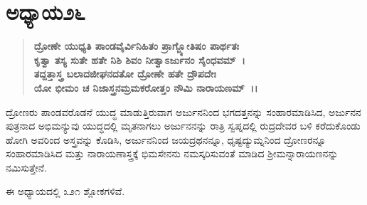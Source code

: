 \vspace{-.2cm}

\section*{ಅಧ್ಯಾಯ\enginline{-}೨೬}

\begin{verse}
\textbf{ದ್ರೋಣೇ ಯುಧ್ಯತಿ ಪಾಂಡವೈರ್ವಿನಿಹಿತಂ ಪ್ರಾಗ್ಜ್ಯೋತಿಷಂ ಪಾರ್ಥತಃ}\\\textbf{ಕೃತ್ವಾ ತಸ್ಯ ಸುತೇ ಹತೇ ನಿಶಿ ಶಿವಂ ನೀತ್ವಾಽರ್ಜುನಂ ಸೈಂಧವಮ್~।}\\\textbf{ತದ್ದತ್ತಾಸ್ತ್ರ ಬಲಾದಜೀಘನದತೋ ದ್ರೋಣೇ ಹತೇ ದ್ರೌಪದೇಃ}\\\textbf{ಯೋ ಭೀಮಂ ಚ ನಿಜಾಸ್ತ್ರನಮ್ರಮಕರೋತ್ತಂ ನೌಮಿ ನಾರಾಯಣಮ್~।।}
\end{verse}

ದ್ರೋಣರು ಪಾಂಡವರೊಡನೆ ಯುದ್ಧ ಮಾಡುತ್ತಿರುವಾಗ ಅರ್ಜುನನಿಂದ ಭಗದತ್ತನನ್ನು ಸಂಹಾರಮಾಡಿಸಿದ, ಅರ್ಜುನನ ಪುತ್ರನಾದ ಅಭಿಮನ್ಯುವು ಯುದ್ಧದಲ್ಲಿ ಮೃತನಾಗಲು ಅರ್ಜುನನನ್ನು ರಾತ್ರಿ ಸ್ವಪ್ನದಲ್ಲಿ ರುದ್ರದೇವರ ಬಳಿ ಕರೆದುಕೊಂಡು ಹೋಗಿ ಅವರಿಂದ ಅಸ್ತ್ರವನ್ನು ಕೊಡಿಸಿ, ಅರ್ಜುನನಿಂದ ಜಯದ್ರಥನನ್ನೂ, ಧೃಷ್ಟದ್ಯುಮ್ನನಿಂದ ದ್ರೋಣರನ್ನೂ ಸಂಹಾರಮಾಡಿಸಿದ ಮತ್ತು ನಾರಾಯಣಾಸ್ತ್ರಕ್ಕೆ ಭಿಮಸೇನನು ನಮಸ್ಕರಿಸುವಂತೆ ಮಾಡಿದ ಶ‍್ರೀಮನ್ನಾರಾಯಣನನ್ನು ನಮಿಸುತ್ತೇನೆ.

ಈ ಅಧ್ಯಾಯದಲ್ಲಿ ೩೨೧ ಶ್ಲೋಕಗಳಿವೆ.

